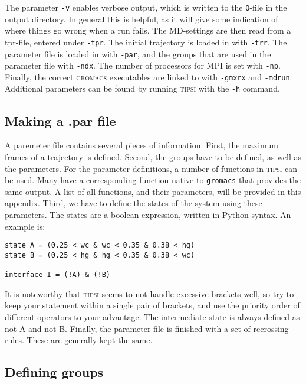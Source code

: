 \documentclass[]{article}
\begin{document}
The parameter \texttt{-v} enables verbose output, which is written to the \texttt{O}-file in the output directory. 
In general this is helpful, as it will give some indication of where things go wrong when a run fails. 
The MD-settings are then read from a tpr-file, entered under \texttt{-tpr}. 
The initial trajectory is loaded in with \texttt{-trr}. 
The parameter file is loaded in with \texttt{-par}, and the groups that are used in the parameter file with \texttt{-ndx}. 
The number of processors for MPI is set with \texttt{-np}. 
Finally, the correct \textsc{gromacs} executables are linked to with \texttt{-gmxrx} and \texttt{-mdrun}.
Additional parameters can be found by running \textsc{tipsi} with the \texttt{-h} command.

\subsection*{Making a .par file}

A paremeter file contains several pieces of information. First, the maximum frames of a trajectory is defined. 
Second, the groups have to be defined, as well as the parameters. 
For the parameter definitions, a number of functions in \textsc{tipsi} can be used. 
Many have a corresponding function native to \texttt{gromacs} that provides the same output. 
A list of all functions, and their parameters, will be provided in this appendix. 
Third, we have to define the states of the system using these parameters.
The states are a boolean expression, written in Python-syntax. An example is:

\begin{lstlisting}
state A = (0.25 < wc & wc < 0.35 & 0.38 < hg)
state B = (0.25 < hg & hg < 0.35 & 0.38 < wc)

interface I = (!A) & (!B)
\end{lstlisting}

It is noteworthy that \textsc{tipsi} seems to not handle excessive brackets well, so try to keep your statement within a single pair of brackets, and use the priority order of different operators to your advantage.
The intermediate state is always defined as not A and not B.
Finally, the parameter file is finished with a set of recrossing rules. These are generally kept the same.

\subsection*{Defining groups}
\end{document}
